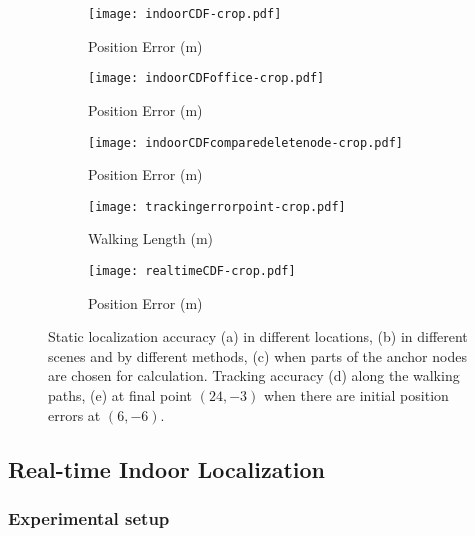 \documentclass[]{sig-alternate-10pt}
\begin{document}
\begin{figure*}[htpb]
    \begin{subfigure}[c]{0.19\textwidth}
        \texttt{[image: indoorCDF-crop.pdf]}
        \caption{Position Error (m)}
    \label{fig:indoorCDF}
    \end{subfigure}
    \begin{subfigure}[c]{0.19\textwidth}
        \texttt{[image: indoorCDFoffice-crop.pdf]}
        \caption{Position Error (m)}
    \label{fig:indoorCDFoffice}
    \end{subfigure}
    \begin{subfigure}[c]{0.19\textwidth}
        \texttt{[image: indoorCDFcomparedeletenode-crop.pdf]}
    \caption{Position Error (m)}
    \label{fig:errordeletenode}
    \end{subfigure}
    \begin{subfigure}[c]{0.19\textwidth}
        \texttt{[image: trackingerrorpoint-crop.pdf]}
    \caption{Walking Length (m)}
    \label{fig:trackingerrordetail}
    \end{subfigure}
    \begin{subfigure}[c]{0.19\textwidth}
       \texttt{[image: realtimeCDF-crop.pdf]}
        \caption{Position Error (m)}
        \label{fig:initialerroreffect}
        \end{subfigure}
    \caption{ Static localization accuracy (a) in different locations,
      (b) in different scenes and by different methods, (c) when parts
      of the anchor nodes are chosen for calculation.  Tracking
      accuracy (d) along the walking paths, (e) at final point
      $(24,-3)$ when there are initial position errors at $(6,-6)$.  } 
\end{figure*}

\subsection{Real-time Indoor Localization}
\label{sec:indorrexp}
\subsubsection{Experimental setup}
\end{document}
